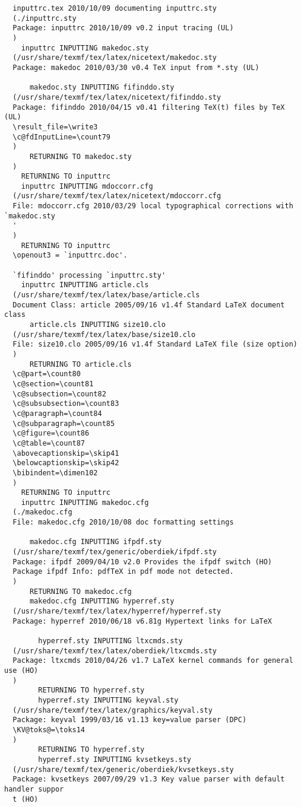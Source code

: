 \documentclass[fleqn]{article}%
\begin{document}
  \begin{verbatim}
  inputtrc.tex 2010/10/09 documenting inputtrc.sty
  (./inputtrc.sty
  Package: inputtrc 2010/10/09 v0.2 input tracing (UL)
  )
    inputtrc INPUTTING makedoc.sty 
  (/usr/share/texmf/tex/latex/nicetext/makedoc.sty
  Package: makedoc 2010/03/30 v0.4 TeX input from *.sty (UL)
  
      makedoc.sty INPUTTING fifinddo.sty 
  (/usr/share/texmf/tex/latex/nicetext/fifinddo.sty
  Package: fifinddo 2010/04/15 v0.41 filtering TeX(t) files by TeX (UL)
  \result_file=\write3
  \c@fdInputLine=\count79
  )
      RETURNING TO makedoc.sty 
  )
    RETURNING TO inputtrc 
    inputtrc INPUTTING mdoccorr.cfg 
  (/usr/share/texmf/tex/latex/nicetext/mdoccorr.cfg
  File: mdoccorr.cfg 2010/03/29 local typographical corrections with `makedoc.sty
  '
  )
    RETURNING TO inputtrc 
  \openout3 = `inputtrc.doc'.
  
  `fifinddo' processing `inputtrc.sty'
    inputtrc INPUTTING article.cls 
  (/usr/share/texmf/tex/latex/base/article.cls
  Document Class: article 2005/09/16 v1.4f Standard LaTeX document class
      article.cls INPUTTING size10.clo 
  (/usr/share/texmf/tex/latex/base/size10.clo
  File: size10.clo 2005/09/16 v1.4f Standard LaTeX file (size option)
  )
      RETURNING TO article.cls 
  \c@part=\count80
  \c@section=\count81
  \c@subsection=\count82
  \c@subsubsection=\count83
  \c@paragraph=\count84
  \c@subparagraph=\count85
  \c@figure=\count86
  \c@table=\count87
  \abovecaptionskip=\skip41
  \belowcaptionskip=\skip42
  \bibindent=\dimen102
  )
    RETURNING TO inputtrc 
    inputtrc INPUTTING makedoc.cfg 
  (./makedoc.cfg
  File: makedoc.cfg 2010/10/08 doc formatting settings
  
      makedoc.cfg INPUTTING ifpdf.sty 
  (/usr/share/texmf/tex/generic/oberdiek/ifpdf.sty
  Package: ifpdf 2009/04/10 v2.0 Provides the ifpdf switch (HO)
  Package ifpdf Info: pdfTeX in pdf mode not detected.
  )
      RETURNING TO makedoc.cfg 
      makedoc.cfg INPUTTING hyperref.sty 
  (/usr/share/texmf/tex/latex/hyperref/hyperref.sty
  Package: hyperref 2010/06/18 v6.81g Hypertext links for LaTeX
  
        hyperref.sty INPUTTING ltxcmds.sty 
  (/usr/share/texmf/tex/latex/oberdiek/ltxcmds.sty
  Package: ltxcmds 2010/04/26 v1.7 LaTeX kernel commands for general use (HO)
  )
        RETURNING TO hyperref.sty 
        hyperref.sty INPUTTING keyval.sty 
  (/usr/share/texmf/tex/latex/graphics/keyval.sty
  Package: keyval 1999/03/16 v1.13 key=value parser (DPC)
  \KV@toks@=\toks14
  )
        RETURNING TO hyperref.sty 
        hyperref.sty INPUTTING kvsetkeys.sty 
  (/usr/share/texmf/tex/generic/oberdiek/kvsetkeys.sty
  Package: kvsetkeys 2007/09/29 v1.3 Key value parser with default handler suppor
  t (HO)
  

\end{verbatim}
\end{document}
